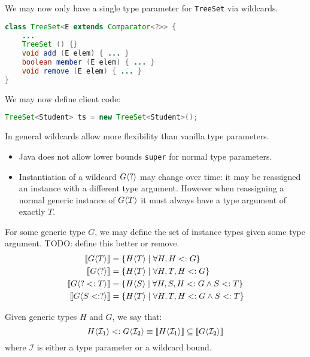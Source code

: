 \documentclass{article}
\begin{document}
\begin{example}
We may now only have a single type parameter for \texttt{TreeSet} via wildcards.
\begin{lstlisting}[escapechar=|, language=Java]
class TreeSet<E extends Comparator<?>> {
    ...
    TreeSet () {}
    void add (E elem) { ... }
    boolean member (E elem) { ... }
    void remove (E elem) { ... }
}
\end{lstlisting}
We may now define client code:
\begin{lstlisting}[escapechar=|, language=Java]
TreeSet<Student> ts = new TreeSet<Student>();
\end{lstlisting}
\end{example}

In general wildcards allow more flexibility than vanilla type parameters.
\begin{itemize}
\item Java does not allow lower bounds \texttt{super} for normal type parameters.
\item Instantiation of a wildcard $G \langle ? \rangle$ may change over time: it may be reassigned an instance with a different type argument. However when reassigning a normal generic instance of $G \langle T \rangle$ it must always have a type argument of exactly $T$.
\end{itemize}

For some generic type $G$, we may define the set of instance types given some type argument.
TODO: define this better or remove.
\begin{align}
\llbracket G \langle T \rangle \rrbracket &= \{ H \langle T \rangle \mid \forall H, H <: G \} \\
\llbracket G \langle ? \rangle \rrbracket &= \{ H \langle T \rangle \mid \forall H, T, H <: G \} \\
\llbracket G \langle ? <: T \rangle \rrbracket &= \{ H \langle S \rangle \mid \forall H, S, H <: G \wedge S <: T \} \\
\llbracket G \langle S <: ? \rangle \rrbracket &= \{ H \langle T \rangle \mid \forall H, T, H <: G \wedge S <: T \}
\end{align}

\begin{definition}
Given generic types $H$ and $G$, we say that:
$$H \langle \mathcal{I}_1 \rangle <: G \langle \mathcal{I}_2 \rangle \equiv \llbracket H \langle \mathcal{I}_1 \rangle \rrbracket \subseteq \llbracket G \langle \mathcal{I}_2 \rangle \rrbracket $$
where $\mathcal{I}$ is either a type parameter or a wildcard bound.
\end{definition}
\end{document}
